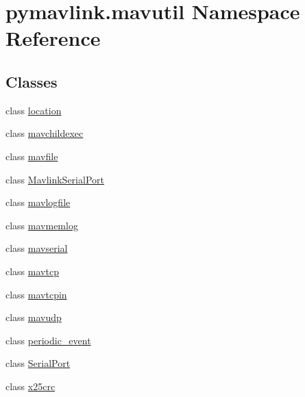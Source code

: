 \hypertarget{namespacepymavlink_1_1mavutil}{}\section{pymavlink.\+mavutil Namespace Reference}
\label{namespacepymavlink_1_1mavutil}
\subsection*{Classes}
\begin{DoxyCompactItemize}
\item 
class \hyperlink{classpymavlink_1_1mavutil_1_1location}{location}
\item 
class \hyperlink{classpymavlink_1_1mavutil_1_1mavchildexec}{mavchildexec}
\item 
class \hyperlink{classpymavlink_1_1mavutil_1_1mavfile}{mavfile}
\item 
class \hyperlink{classpymavlink_1_1mavutil_1_1MavlinkSerialPort}{Mavlink\+Serial\+Port}
\item 
class \hyperlink{classpymavlink_1_1mavutil_1_1mavlogfile}{mavlogfile}
\item 
class \hyperlink{classpymavlink_1_1mavutil_1_1mavmemlog}{mavmemlog}
\item 
class \hyperlink{classpymavlink_1_1mavutil_1_1mavserial}{mavserial}
\item 
class \hyperlink{classpymavlink_1_1mavutil_1_1mavtcp}{mavtcp}
\item 
class \hyperlink{classpymavlink_1_1mavutil_1_1mavtcpin}{mavtcpin}
\item 
class \hyperlink{classpymavlink_1_1mavutil_1_1mavudp}{mavudp}
\item 
class \hyperlink{classpymavlink_1_1mavutil_1_1periodic__event}{periodic\+\_\+event}
\item 
class \hyperlink{classpymavlink_1_1mavutil_1_1SerialPort}{Serial\+Port}
\item 
class \hyperlink{classpymavlink_1_1mavutil_1_1x25crc}{x25crc}
\end{DoxyCompactItemize}
